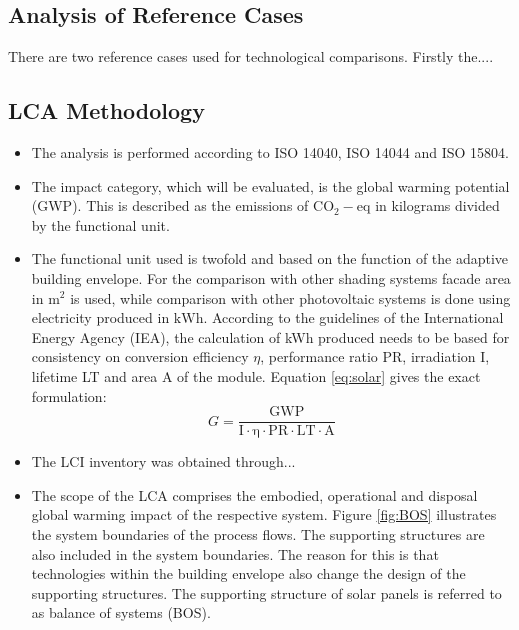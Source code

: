 \subsection{Analysis of Reference Cases}

There are two reference cases used for technological comparisons. Firstly the....


\subsection{LCA Methodology}



\begin{itemize}
\item The analysis is performed according to ISO 14040, ISO 14044 and ISO 15804. %
	\item The impact category, which will be evaluated, is the global warming potential (GWP). This is described as the emissions of ${\mathrm{CO_2-eq}}$ in kilograms divided by the functional unit.
	\item The functional unit used is twofold and based on the function of the adaptive building envelope. For the comparison with other shading systems facade area in ${\mathrm{m^2}}$ is used, while comparison with other photovoltaic systems is done using electricity produced in ${\mathrm{kWh}}$. According to the guidelines of the International Energy Agency (IEA), the calculation of kWh produced needs to be based for consistency on conversion efficiency ${\eta}$, performance ratio PR, irradiation I, lifetime LT and area A of the module. Equation \ref{eq:solar} gives the exact formulation:
\begin{equation}
G=\frac{{\mathrm{GWP}}}{{\mathrm{I \cdot \eta  \cdot PR \cdot LT \cdot A}}}
\label{eq:solar}
\end{equation}

	\item The LCI inventory was obtained through...

	\item The scope of the LCA comprises the embodied, operational and disposal global warming impact of the respective system. Figure \ref{fig:BOS} illustrates the system boundaries of the process flows. The supporting structures are also included in the system boundaries. The reason for this is that technologies within the building envelope also change the design of the supporting structures. The supporting structure of solar panels is referred to as balance of systems (BOS).


\end{itemize}
